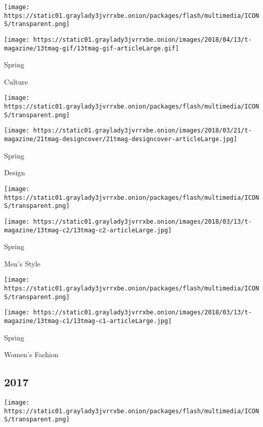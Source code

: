 \texttt{[image: https://static01.graylady3jvrrxbe.onion/packages/flash/multimedia/ICONS/transparent.png]}

\texttt{[image: https://static01.graylady3jvrrxbe.onion/images/2018/04/13/t-magazine/13tmag-gif/13tmag-gif-articleLarge.gif]}

Spring

Culture

\href{https://www.nytimes3xbfgragh.onion/issue/t-magazine/2018/03/13/ts-march-25-design-issue}{}

\texttt{[image: https://static01.graylady3jvrrxbe.onion/packages/flash/multimedia/ICONS/transparent.png]}

\texttt{[image: https://static01.graylady3jvrrxbe.onion/images/2018/03/21/t-magazine/21tmag-designcover/21tmag-designcover-articleLarge.jpg]}

Spring

Design

\href{https://www.nytimes3xbfgragh.onion/issue/t-magazine/2018/02/21/ts-march-4-mens-style-issue}{}

\texttt{[image: https://static01.graylady3jvrrxbe.onion/packages/flash/multimedia/ICONS/transparent.png]}

\texttt{[image: https://static01.graylady3jvrrxbe.onion/images/2018/03/13/t-magazine/13tmag-c2/13tmag-c2-articleLarge.jpg]}

Spring

Men's Style

\href{https://www.nytimes3xbfgragh.onion/issue/t-magazine/2018/02/09/ts-feb-18-womens-fashion-issue}{}

\texttt{[image: https://static01.graylady3jvrrxbe.onion/packages/flash/multimedia/ICONS/transparent.png]}

\texttt{[image: https://static01.graylady3jvrrxbe.onion/images/2018/03/13/t-magazine/13tmag-c1/13tmag-c1-articleLarge.jpg]}

Spring

Women's Fashion

\hypertarget{2017}{%
\subsection{2017}\label{2017}}

\href{https://www.nytimes3xbfgragh.onion/issue/t-magazine/2017/11/17/ts-dec-3-holiday-issue}{}

\texttt{[image: https://static01.graylady3jvrrxbe.onion/packages/flash/multimedia/ICONS/transparent.png]}

